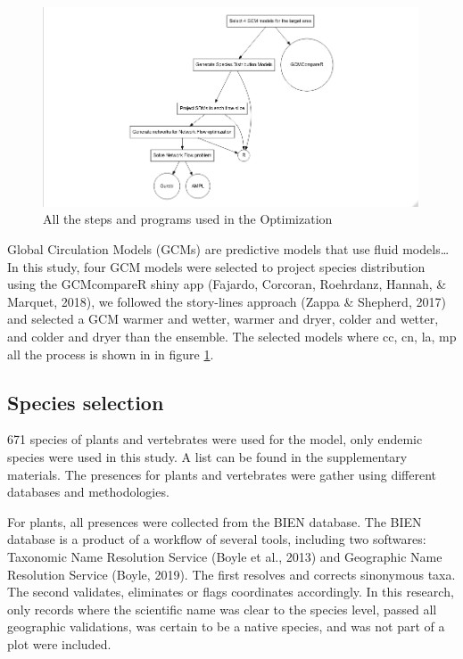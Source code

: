 \documentclass[]{article}
\begin{document}
\begin{figure}
\includegraphics[width=4.39in]{Diag1} \caption{All the steps and programs used in the Optimization}\label{fig:Diagrama}
\end{figure}

Global Circulation Models (GCMs) are predictive models that use fluid models\ldots{}
In this study, four GCM models were selected to project species distribution using the GCMcompareR shiny app (Fajardo, Corcoran, Roehrdanz, Hannah, \& Marquet, 2018), we followed the story-lines approach (Zappa \& Shepherd, 2017) and selected a GCM warmer and wetter, warmer and dryer, colder and wetter, and colder and dryer than the ensemble. The selected models where cc, cn, la, mp all the process is shown in in figure \ref{fig:Diagrama}.

\hypertarget{species-selection}{%
\subsection{Species selection}\label{species-selection}}

671 species of plants and vertebrates were used for the model, only endemic species were used in this study. A list can be found in the supplementary materials. The presences for plants and vertebrates were gather using different databases and methodologies.

For plants, all presences were collected from the BIEN database. The BIEN database is a product of a workflow of several tools, including two softwares: Taxonomic Name Resolution Service (Boyle et al., 2013) and Geographic Name Resolution Service (Boyle, 2019). The first resolves and corrects sinonymous taxa. The second validates, eliminates or flags coordinates accordingly. In this research, only records where the scientific name was clear to the species level, passed all geographic validations, was certain to be a native species, and was not part of a plot were included.
\end{document}
